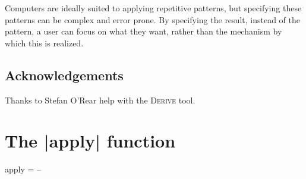 \documentclass[preprint]{sigplanconf}
\newcommand{\derive}{\textsc{Derive}}
\begin{document}
Computers are ideally suited to applying repetitive patterns, but specifying these patterns can be complex and error prone. By specifying the result, instead of the pattern, a user can focus on what they want, rather than the mechanism by which this is realized.


\subsection*{Acknowledgements}

Thanks to Stefan O'Rear help with the \derive{} tool.





\appendix
\section{The |apply| function}

\begin{code}
apply = -- 
\end{code}
\end{document}

